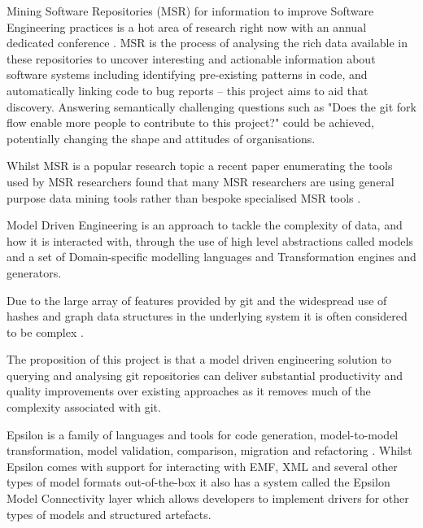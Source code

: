 \documentclass[11pt]{book}
\begin{document}
Mining Software Repositories (MSR) for information to improve Software Engineering practices is a hot area of research right now with an annual dedicated conference \cite{msr2015}. MSR is the process of analysing the rich data available in these repositories to uncover interesting and actionable information about software systems \cite{theroadagainformsr} including identifying pre-existing patterns in code, and automatically linking code to bug reports -- this project aims to aid that discovery. Answering semantically challenging questions such as "Does the git fork flow enable more people to contribute to this project?" could be achieved, potentially changing the shape and attitudes of organisations.

Whilst MSR is a popular research topic a recent paper enumerating the tools used by MSR researchers found that many MSR researchers are using general purpose data mining tools rather than bespoke specialised MSR tools \cite{toolsinminingsoftwarerepositories}.

Model Driven Engineering is an approach to tackle the complexity of data, and how it is interacted with, through the use of high level abstractions called models \cite{modeldrivenengineering} and a set of Domain-specific modelling languages and Transformation engines and generators.   
	
Due to the large array of features provided by git and the widespread use of hashes and graph data structures in the underlying system it is often considered to be complex \cite{gitcomplex}\cite{githard}\cite{gitmixedmetaphors}.

The proposition of this project is that a model driven engineering solution to querying and analysing git repositories can deliver substantial productivity and quality improvements over existing approaches as it removes much of the complexity associated with git.


Epsilon is a family of languages and tools for code generation, model-to-model transformation, model validation, comparison, migration and refactoring \cite{epsilonhomepage}. Whilst Epsilon comes with support for interacting with EMF, XML and several other types of model formats out-of-the-box it also has a system called the Epsilon Model Connectivity layer which allows developers to implement drivers for other types of models and structured artefacts.
\end{document}
